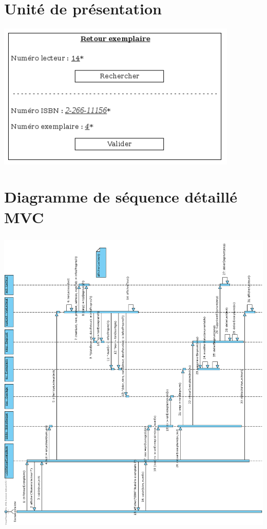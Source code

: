 \documentclass[a4paper,10pt]{report}
\begin{document}
\newpage

\section*{Unité de présentation}
\includegraphics[height=70mm]{UpRetourExemplaire.png}

\section*{Diagramme de séquence détaillé MVC}
\bigskip
\bigskip
{}
\includegraphics[height=150mm]{RetourExemplaireMVC.png}
\end{document}
